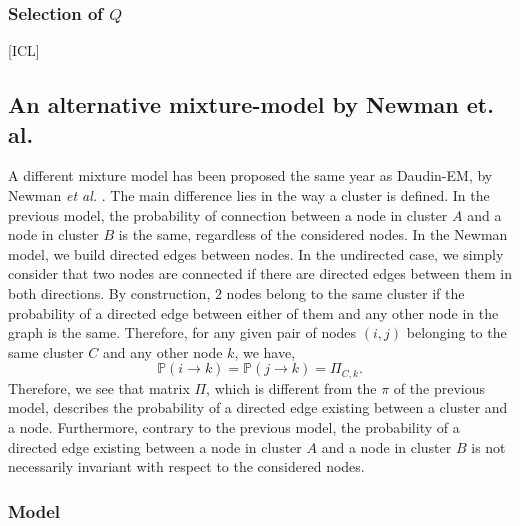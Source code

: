 \documentclass[switch, 12pt]{article}
\begin{document}
\begin{multicols}{2}
    \subsubsection{Selection of $Q$}

    [ICL]

    \subsection{An alternative mixture-model by Newman et. al. \cite{newman}}
    \label{subsec:newman}

    A different mixture model has been proposed the same year as Daudin-EM, by Newman \textit{et al.} \cite{newman}. The main difference lies in the way a cluster is defined. In the previous model, the probability of connection between a node in cluster $A$ and a node in cluster $B$ is the same, regardless of the considered nodes.
    \newline
    \newline
    In the Newman model, we build directed edges between nodes. In the undirected case, we simply consider that two nodes are connected if there are directed edges between them in both directions. By construction, $2$ nodes belong to the same cluster if the probability of a directed edge between either of them and any other node in the graph is the same. Therefore, for any given pair of nodes $(i, j)$ belonging to the same cluster $C$ and any other node $k$, we have,
    \begin{equation}
        \mathbb{P}(i \rightarrow k) = \mathbb{P}(j \rightarrow k) = \Pi_{C, k}.
    \end{equation}
    Therefore, we see that matrix $\Pi$, which is different from the $\pi$ of the previous model, describes the probability of a directed edge existing between a cluster and a node. Furthermore, contrary to the previous model, the probability of a directed edge existing between a node in cluster $A$ and a node in cluster $B$ is not necessarily invariant with respect to the considered nodes.

    \subsubsection{Model}


\end{multicols}
\end{document}
